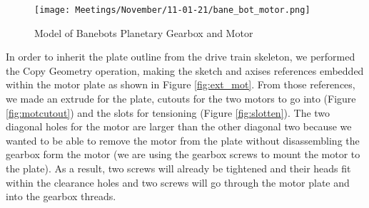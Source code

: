 \begin{figure}[htp]
\centering
\texttt{[image: Meetings/November/11-01-21/bane\_bot\_motor.png]}
\caption{Model of Banebots Planetary Gearbox and Motor}
\label{fig:banemod}
\end{figure}

In order to inherit the plate outline from the drive train skeleton, we performed the Copy Geometry operation, making the sketch and axises references embedded within the motor plate as shown in Figure \ref{fig:ext_mot}. From those references, we made an extrude for the plate, cutouts for the two motors to go into (Figure \ref{fig:motcutout}) and the slots for tensioning (Figure \ref{fig:slotten}). The two diagonal holes for the motor are larger than the other diagonal two because we wanted to be able to remove the motor from the plate without disassembling the gearbox form the motor (we are using the gearbox screws to mount the motor to the plate). As a result, two screws will already be tightened and their heads fit within the clearance holes and two screws will go through the motor plate and into the gearbox threads.


